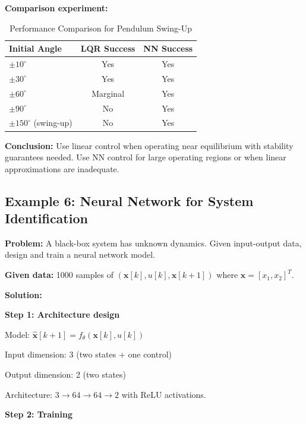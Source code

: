 \textbf{Comparison experiment:}

\begin{table}[htbp]
\centering
\caption{Performance Comparison for Pendulum Swing-Up}
\label{tab:pendulum_comparison}
\begin{tabular}{lcc}
\toprule
\textbf{Initial Angle} & \textbf{LQR Success} & \textbf{NN Success} \\
\midrule
$\pm 10^\circ$ & Yes & Yes \\
$\pm 30^\circ$ & Yes & Yes \\
$\pm 60^\circ$ & Marginal & Yes \\
$\pm 90^\circ$ & No & Yes \\
$\pm 150^\circ$ (swing-up) & No & Yes \\
\bottomrule
\end{tabular}
\end{table}

\textbf{Conclusion:} Use linear control when operating near equilibrium with stability guarantees needed. Use NN control for large operating regions or when linear approximations are inadequate.

\hrulefill

\subsection{Example 6: Neural Network for System Identification}

\textbf{Problem:} A black-box system has unknown dynamics. Given input-output data, design and train a neural network model.

\textbf{Given data:} 1000 samples of $(\mathbf{x}[k], u[k], \mathbf{x}[k+1])$ where $\mathbf{x} = [x_1, x_2]^T$.

\textbf{Solution:}

\textbf{Step 1: Architecture design}

Model: $\hat{\mathbf{x}}[k+1] = f_\theta(\mathbf{x}[k], u[k])$

Input dimension: 3 (two states + one control)

Output dimension: 2 (two states)

Architecture: $3 \to 64 \to 64 \to 2$ with ReLU activations.

\textbf{Step 2: Training}

